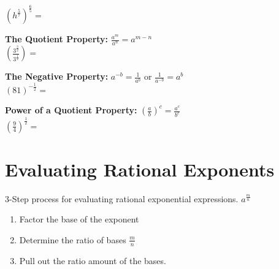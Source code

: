 \documentclass[12pt]{article}
\begin{document}
\hspace{1in} $\left(h^{\frac{5}{7}}\right)^{\frac{6}{5}}=$\\

\vspace{1cm}

\textbf{The Quotient Property:} $\frac{a^m}{a^n}=a^{m-n}$\\

\hspace{1in} $\left(\frac{3^{\frac{3}{2}}}{3^{\frac{1}{2}}}\right)=$\\

\vspace{1cm}

\textbf{The Negative Property:} $a^{-b}=\frac{1}{a^{b}}$ \hspace{1cm} or \hspace{1cm} $\frac{1}{a^{-b}}=a^b$\\

\hspace{1in} $(81)^{-\frac{1}{2}}=$\\

\vspace{1cm}

\textbf{Power of a Quotient Property:} $\left(\frac{a}{b}\right)^c=\frac{a^c}{b^c}$\\

\hspace{1in} $\left(\frac{9}{4}\right)^{\frac{1}{2}}=$\\

\vspace{1cm}


\pagebreak

\section{Evaluating Rational Exponents}

3-Step process for evaluating rational exponential expressions. $a^{\frac{m}{n}}$

\begin{enumerate}

	\item Factor the base of the exponent 
	
	\item Determine the ratio of bases $\frac{m}{n}$
	
	\item Pull out the ratio amount of the bases. 

\end{enumerate}
\end{document}
